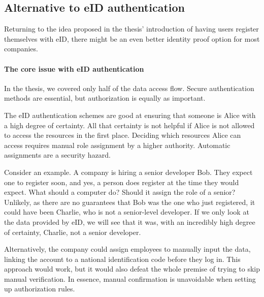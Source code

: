 

\subsection{Alternative to eID authentication}

Returning to the idea proposed in the thesis' introduction of having users register themselves with eID, there might be an even better identity proof option for most companies.

\paragraph{The core issue with eID authentication}

In the thesis, we covered only half of the data access flow. Secure authentication methods are essential, but authorization is equally as important.

The eID authentication schemes are good at ensuring that someone is Alice with a high degree of certainty. All that certainty is not helpful if Alice is not allowed to access the resources in the first place. Deciding which resources Alice can access requires manual role assignment by a higher authority. Automatic assignments are a security hazard.

Consider an example. A company is hiring a senior developer Bob. They expect one to register soon, and yes, a person does register at the time they would expect. What should a computer do? Should it assign the role of a senior? Unlikely, as there are no guarantees that Bob was the one who just registered, it could have been Charlie, who is not a senior-level developer. If we only look at the data provided by eID, we will see that it was, with an incredibly high degree of certainty, Charlie, not a senior developer.

Alternatively, the company could assign employees to manually input the data, linking the account to a national identification code before they log in. This approach would work, but it would also defeat the whole premise of trying to skip manual verification. In essence, manual confirmation is unavoidable when setting up authorization rules.


